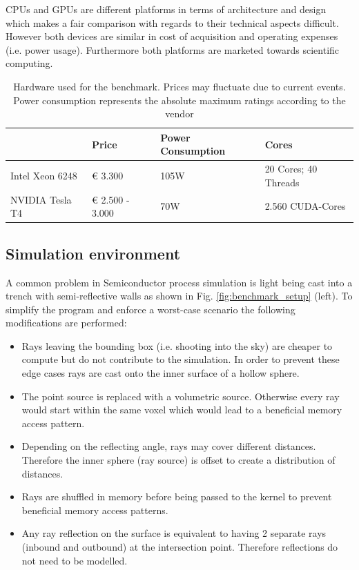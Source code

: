 CPUs and GPUs are different platforms in terms of architecture and design which makes a fair comparison with regards to their technical aspects difficult.
However both devices are similar in cost of acquisition and operating expenses (i.e. power usage).
Furthermore both platforms are marketed towards scientific computing.


\begin{table}[H]

	\caption{Hardware used for the benchmark. Prices may fluctuate due to current events. Power consumption represents the absolute maximum ratings according to the vendor}
	\centering
	\begin{tabular}{@{}llll@{}}
		\toprule
		                & Price           & Power Consumption & Cores                \\ \hline
		Intel Xeon 6248 & € 3.300         & 105W              & 20 Cores; 40 Threads \\
		NVIDIA Tesla T4 & € 2.500 - 3.000 & 70W               & 2.560 CUDA-Cores     \\ \bottomrule
	\end{tabular}
	\label{tab:hardware}
\end{table}


\subsection{Simulation environment}

A common problem in Semiconductor process simulation is light being cast into a trench with semi-reflective walls as shown in Fig. \ref{fig:benchmark_setup} (left).
To simplify the program and enforce a worst-case scenario the following modifications are performed:

\begin{itemize}
	\item Rays leaving the bounding box (i.e. shooting into the sky) are cheaper to compute but do not contribute to the simulation.
	      In order to prevent these edge cases rays are cast onto the inner surface of a hollow sphere.
	\item The point source is replaced with a volumetric source. Otherwise every ray would start within the same voxel which would lead to a beneficial memory access pattern.
	\item Depending on the reflecting angle, rays may cover different distances. Therefore the inner sphere (ray source) is offset to create a distribution of distances.
	\item Rays are shuffled in memory before being passed to the kernel to prevent beneficial memory access patterns.
	\item Any ray reflection on the surface is equivalent to having 2 separate rays (inbound and outbound) at the intersection point. Therefore reflections do not need to be modelled.
\end{itemize}


